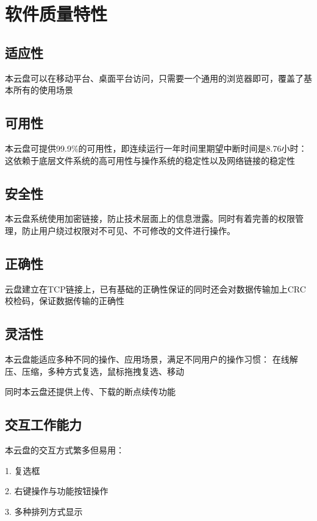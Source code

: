 \chapter{软件质量特性}

\section{适应性}

本云盘可以在移动平台、桌面平台访问，只需要一个通用的浏览器即可，覆盖了基本所有的使用场景

\section{可用性}

本云盘可提供99.9\%的可用性，即连续运行一年时间里期望中断时间是8.76小时：这依赖于底层文件系统的高可用性与操作系统的稳定性以及网络链接的稳定性

\section{安全性}

本云盘系统使用加密链接，防止技术层面上的信息泄露。同时有着完善的权限管理，防止用户绕过权限对不可见、不可修改的文件进行操作。

\section{正确性}

云盘建立在TCP链接上，已有基础的正确性保证的同时还会对数据传输加上CRC校检码，保证数据传输的正确性

\section{灵活性}

本云盘能适应多种不同的操作、应用场景，满足不同用户的操作习惯：
在线解压、压缩，多种方式复选，鼠标拖拽复选、移动

同时本云盘还提供上传、下载的断点续传功能

\section{交互工作能力}

本云盘的交互方式繁多但易用：

1. 复选框

2. 右键操作与功能按钮操作

3. 多种排列方式显示


